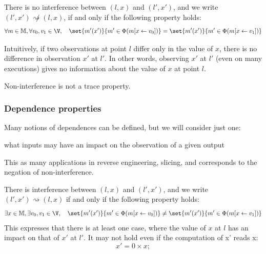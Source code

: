 \documentclass[toc]{../cs-classes/cs-classes}
\begin{document}
\begin{definition}
    There is no interference between $(l, x)$ and $(l', x')$, and we write $(l', x') \not\rightsquigarrow (l, x)$, if and only if the following property holds:
    \begin{equation*}
        \forall m\in\mathbb{M}, \forall v_0, v_1\in\V, \quad \set{m'(x')}{m'\in\Phi(m[x\leftarrow v_0])} = \set{m'(x')}{m'\in\Phi(m[x\leftarrow v_1])}
    \end{equation*}

    Intuitively, if two observations at point $l$ differ only in the value of $x$, there is no difference in observation $x'$ at $l'$. In other words, observing $x'$ at $l'$ (even on many executions) gives no information about the value of $x$ at point $l$.
\end{definition}

\begin{property}
    Non-interference is not a trace property.
\end{property}

\subsubsection{Dependence properties}
Many notions of dependences can be defined, but we will consider just one:
\begin{center}
    what inputs may have an impact on the observation of a given output
\end{center}
This as many applications in reverse engineering, slicing, and corresponds to the negation of non-interference.

\begin{definition}[Interference]
    There is interference between $(l, x)$ and $(l', x')$, and we write $(l', x')\rightsquigarrow(l, x)$ if and only if the following property holds:
    \begin{equation*}
        \exists x\in \mathbb{M}, \exists v_0, v_1\in\V, \quad \set{m'(x')}{m'\in\Phi(m[x\leftarrow v_0])} \neq \set{m'(x')}{m'\in\Phi(m[x\leftarrow v_1])}
    \end{equation*}
    This expresses that there is at least one case, where the value of $x$ at $l$ has an impact on that of $x'$ at $l'$. It may not hold even if the computation of x' reads x:
    \begin{equation*}
        x' = 0 \times x;
    \end{equation*}
\end{definition}
\end{document}
